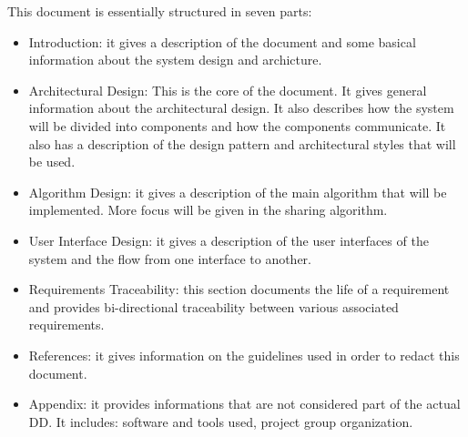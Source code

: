 This document is essentially structured in seven parts:
\begin{itemize}
	\item Introduction: it gives a description of the  document and some basical information about the system design and archicture. 
	
	\item Architectural Design: This is the core of the document.
	 It gives general information about the architectural design. It also describes how the system will be divided into components and how the components communicate. It also has a description of the design pattern and architectural styles that will be used.
	
	\item Algorithm Design: it gives a description of the main algorithm that will be implemented. More focus will be given in the sharing algorithm.
	
	\item User Interface Design: it gives a description of the user interfaces of the system and the flow from one interface to another.
	
	\item Requirements Traceability: this section documents the life of a requirement and provides bi-directional traceability between various associated requirements. 
	
	\item References: it gives information on the guidelines used in order to redact this document.
	
	\item Appendix: it provides informations that are not considered part of the actual DD. It includes: software and tools used, project group organization.
	
\end{itemize}
